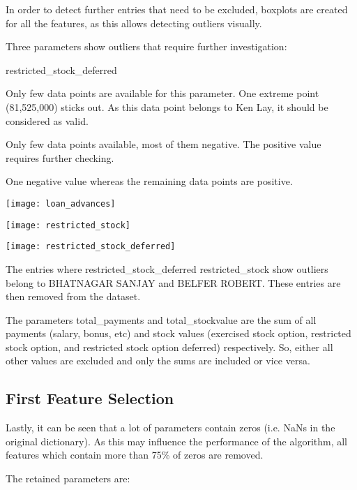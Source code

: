 \documentclass[11pt]{article} %
\begin{document}
In order to detect further entries that need to be excluded, boxplots are created for all the features, as this allows detecting outliers visually.\medskip

Three parameters show outliers that require further investigation:


\begin{labeling}{restricted\_stock\_deferred}
\item [loan\_advances] Only few data points are available for this parameter. One extreme point (81,525,000) sticks out. As this data point belongs to Ken Lay, it should be considered as valid.
\item [restricted\_stock\_deferred] Only few data points available, most of them negative. The positive value requires further checking. 
\item [restricted\_stock] One negative value whereas the remaining data points are positive.
\end{labeling}

\texttt{[image: loan\_advances]}

\texttt{[image: restricted\_stock]}

\texttt{[image: restricted\_stock\_deferred]}

The entries where restricted\_stock\_deferred restricted\_stock show outliers belong to BHATNAGAR SANJAY and BELFER ROBERT. These entries are then removed from the dataset.\medskip

The parameters total\_payments and total\_stockvalue are the sum of all payments (salary, bonus, etc) and stock values (exercised stock option, restricted stock option, and restricted stock option deferred) respectively. So, either all other values are excluded and only the sums are included or vice versa.

\subsection{First Feature Selection}
Lastly, it can be seen that a lot of parameters contain zeros (i.e. NaNs in the original dictionary). As this may influence the performance of the algorithm, all features which contain more than 75\% of zeros are removed.\medskip

The retained parameters are:

{}
\end{document}
